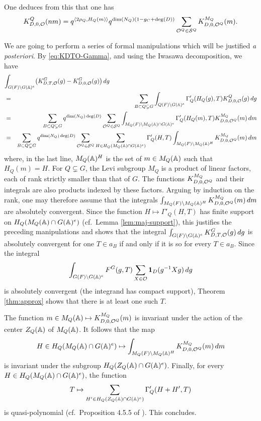 \begin{paragr}
One deduces from this that one has
\begin{equation}
  \label{eq:KQD0O-produit}
  K^Q_{D,0,\mathcal{O}}(nm)= q^{\langle 2\rho_Q,H_Q(m)\rangle} q^{\dim(N_Q)(1-g_C+\deg(D))} \sum_{\mathcal{O}^Q\in \mathcal{S}^Q} K^{M_Q}_{D,0,\mathcal{O}^Q}(m).
\end{equation}

We are going to perform a series of formal manipulations which will be justified \emph{a posteriori}. By \eqref{eq:KDTO-Gamma}, and using the Iwasawa decomposition, we have
\begin{eqnarray*}
  \lefteqn{\int_{G(F)\backslash G(\AAA)^e} \bigl(K^G_{D,T,\oc}(g)-K^G_{D,0,\oc}(g)\bigr)\, dg}\\
  &=&\sum_{B\subset Q\subsetneq G} \int_{Q(F)\backslash G(\AAA)^e} \Gamma'_Q(H_Q(g),T) K^Q_{D,0,\oc}(g)\, dg\\
  &=&\sum_{B\subset Q\subsetneq G} q^{\dim(N_Q)\deg(D)} \sum_{\oc^Q\in \mathcal{S}^Q} \int_{M_Q(F)\backslash M_Q(\AAA)\cap G(\AAA)^e} \Gamma'_Q(H_Q(m),T) K^{M_Q}_{D,0,\oc^Q}(m)\, dm\\
  &=&\sum_{B\subset Q\subsetneq G} q^{\dim(N_Q)\deg(D)} \sum_{\oc^Q\in \mathcal{S}^Q} \sum_{H\in H_Q(M_Q(\AAA)\cap G(\AAA)^e)} \Gamma'_Q(H,T) \int_{M_Q(F)\backslash M_Q(\AAA)^H} K^{M_Q}_{D,0,\oc^Q}(m)\, dm
\end{eqnarray*}
where, in the last line, $M_Q(\mathbb{A})^H$ is the set of $m\in M_Q(\mathbb{A})$ such that $H_Q(m)=H$. For $Q\subsetneq G$, the Levi subgroup $M_Q$ is a product of linear factors, each of rank strictly smaller than that of $G$. The functions $K^{M_Q}_{D,0,\mathcal{O}^Q}$ and their integrals are also products indexed by these factors. Arguing by induction on the rank, one may therefore assume that the integrals $\int_{M_Q(F)\backslash M_Q(\mathbb{A})^H} K^{M_Q}_{D,0,\mathcal{O}^Q}(m)\, dm$ are absolutely convergent. Since the function $H\mapsto \Gamma'_Q(H,T)$ has finite support on $H_Q(M_Q(\mathbb{A})\cap G(\mathbb{A})^e)$ (cf.\ Lemma \ref{lem:maj-support}), this justifies the preceding manipulations and shows that the integral $\int_{G(F)\backslash G(\mathbb{A})^e} K^G_{D,T,\mathcal{O}}(g)\, dg$ is absolutely convergent for one $T\in a_B$ if and only if it is so for every $T\in a_B$. Since the integral
$$\int_{G(F)\backslash G(\mathbb{A})^e} F^G(g,T)\sum_{X\in \mathcal{O}} \mathbf{1}_D(g^{-1}Xg)\, dg$$
is absolutely convergent (the integrand has compact support), Theorem \ref{thm:approx} shows that there is at least one such $T$.

The function $m\in M_Q(\mathbb{A})\mapsto K^{M_Q}_{D,0,\mathcal{O}^Q}(m)$ is invariant under the action of the center $Z_Q(\mathbb{A})$ of $M_Q(\mathbb{A})$. It follows that the map
$$H\in H_Q(M_Q(\mathbb{A})\cap G(\mathbb{A})^e)\mapsto \int_{M_Q(F)\backslash M_Q(\mathbb{A})^H} K^{M_Q}_{D,0,\mathcal{O}^Q}(m)\, dm$$
is invariant under the subgroup $H_Q(Z_Q(\mathbb{A})\cap G(\mathbb{A})^e)$. Finally, for every $H\in H_Q(M_Q(\mathbb{A})\cap G(\mathbb{A})^e)$, the function
$$T\mapsto \sum_{H'\in H_Q(Z_Q(\mathbb{A})\cap G(\mathbb{A})^e)} \Gamma'_Q(H+H',T)$$
is quasi-polynomial (cf.\ Proposition 4.5.5 of \cite{scfh}). This concludes.
\end{paragr}


